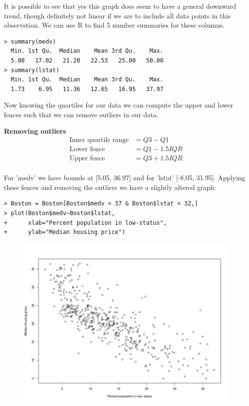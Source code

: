 \documentclass{article}
\begin{document}
It is possible to see that yes this graph does seem to have a general downward 
trend, though definitely not linear if we are to include all data points in 
this observation. We can use R to find 5 number summaries for these columns.

\begin{verbatim}
> summary(medv)
  Min. 1st Qu.  Median    Mean 3rd Qu.    Max. 
  5.00   17.02   21.20   22.53   25.00   50.00 
> summary(lstat)
  Min. 1st Qu.  Median    Mean 3rd Qu.    Max. 
  1.73    6.95   11.36   12.65   16.95   37.97 
\end{verbatim}

Now knowing the quartiles for our data we can compute the upper and lower fences
such that we can remove outliers in our data.

\pagebreak

{\large \bf Removing outliers}\\
\begin{align*}
  \text{Inner quartile range} &= Q3 - Q1    \\
  \text{Lower fence} &= Q1 - 1.5IQR         \\
  \text{Upper fence} &= Q3 + 1.5IQR         \\
\end{align*}

For 'medv' we have bounds at [5.05, 36.97] and for 'lstat' [-8.05, 31.95].
Applying these fences and removing the outliers we have a slightly altered graph:

\begin{verbatim}
> Boston = Boston[Boston$medv < 37 & Boston$lstat < 32,]
> plot(Boston$medv~Boston$lstat, 
+      xlab="Percent population in low-status",
+      ylab="Median housing price")
\end{verbatim}

\begin{figure}[!ht]
  \centering
  \includegraphics[width=0.65\linewidth]{medv-vs-lstat-rm-outliers.pdf}
\end{figure}
\end{document}
